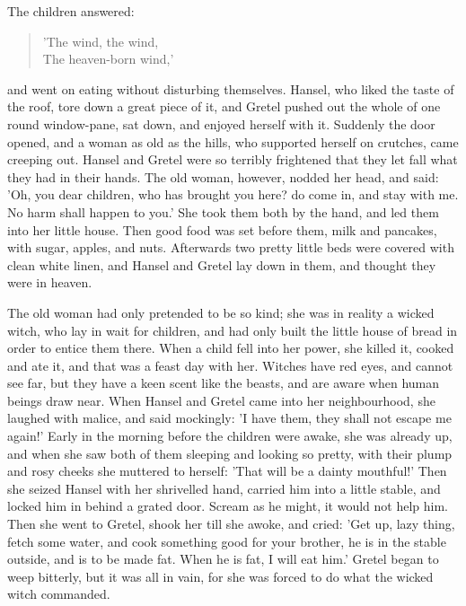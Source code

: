 \documentclass[12pt]{book}
\begin{document}
The children answered:

\begin{verse}
 'The wind, the wind,\\
  The heaven-born wind,'
\end{verse}

and went on eating without disturbing themselves. Hansel, who liked
the taste of the roof, tore down a great piece of it, and Gretel
pushed out the whole of one round window-pane, sat down, and enjoyed
herself with it. Suddenly the door opened, and a woman as old as the
hills, who supported herself on crutches, came creeping out. Hansel
and Gretel were so terribly frightened that they let fall what they
had in their hands. The old woman, however, nodded her head, and said:
'Oh, you dear children, who has brought you here? do come in, and stay
with me. No harm shall happen to you.' She took them both by the hand,
and led them into her little house. Then good food was set before
them, milk and pancakes, with sugar, apples, and nuts. Afterwards two
pretty little beds were covered with clean white linen, and Hansel and
Gretel lay down in them, and thought they were in heaven.

The old woman had only pretended to be so kind; she was in reality a
wicked witch, who lay in wait for children, and had only built the
little house of bread in order to entice them there. When a child fell
into her power, she killed it, cooked and ate it, and that was a feast
day with her. Witches have red eyes, and cannot see far, but they have
a keen scent like the beasts, and are aware when human beings draw
near. When Hansel and Gretel came into her neighbourhood, she laughed
with malice, and said mockingly: 'I have them, they shall not escape
me again!' Early in the morning before the children were awake, she
was already up, and when she saw both of them sleeping and looking so
pretty, with their plump and rosy cheeks she muttered to herself:
'That will be a dainty mouthful!' Then she seized Hansel with her
shrivelled hand, carried him into a little stable, and locked him in
behind a grated door. Scream as he might, it would not help him. Then
she went to Gretel, shook her till she awoke, and cried: 'Get up, lazy
thing, fetch some water, and cook something good for your brother, he
is in the stable outside, and is to be made fat. When he is fat, I
will eat him.' Gretel began to weep bitterly, but it was all in vain,
for she was forced to do what the wicked witch commanded.
\end{document}
